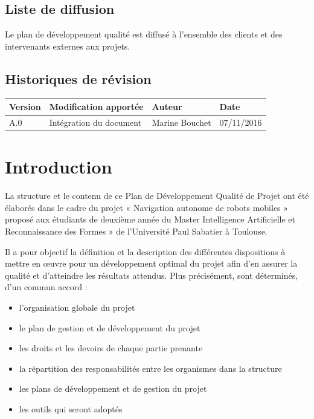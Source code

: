 \documentclass[10pt,a4paper]{article}
\begin{document}
\subsection*{Liste de diffusion}

Le plan de développement qualité est diffusé à l'ensemble des clients et des intervenants externes aux projets.

\subsection*{Historiques de révision}

\begin{center}
    \begin{tabular}{| l | l | l | l |}
    \hline
     \rowcolor{gray} Version & Modification apportée & Auteur & Date \\ \hline
    A.0 & Intégration du document & Marine Bouchet & 07/11/2016\\
     \hline
    \end{tabular}
\end{center}

\newpage
\tableofcontents
\newpage
	

\section{Introduction}
\label{sec:introduction}

La structure et le contenu de ce Plan de Développement Qualité de Projet ont été élaborés dans le cadre du projet « Navigation autonome de robots mobiles » proposé aux étudiants de deuxième année du Master  Intelligence Artificielle et Reconnaissance des Formes » de l'Université Paul Sabatier à Toulouse.

Il a pour objectif la définition et la description des différentes dispositions à mettre en œuvre pour un développement optimal du projet afin d’en assurer la qualité et d’atteindre les résultats attendus. Plus précisément, sont déterminés, d’un commun accord :
\begin{itemize}
\item l’organisation globale du projet 
\item le plan de gestion et de développement du projet
\item les droits et les devoirs de chaque partie prenante
\item la répartition des responsabilités entre les organismes dans la structure
\item les plans de développement et de gestion du projet
\item les outils qui seront adoptés 
\end{itemize}
\end{document}
